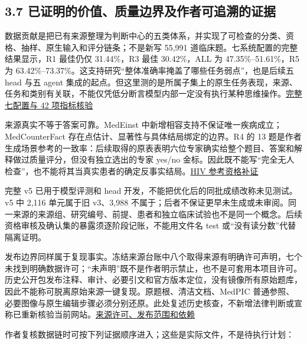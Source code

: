 \documentclass[
  11pt,
  a4paper,
]{article}
\begin{document}
\subsection{3.7
已证明的价值、质量边界及作者可追溯的证据}\label{ux5df2ux8bc1ux660eux7684ux4ef7ux503cux8d28ux91cfux8fb9ux754cux53caux4f5cux8005ux53efux8ffdux6eafux7684ux8bc1ux636e}

数据贡献是把已有来源整理为判断中心的五类体系，并实现了可检查的分类、资格、抽样、原生输入和评分链条；不是新写
55,991 道临床题。七系统配置的完整结果显示，R1 最佳仍仅 31.44\%，R3 最佳
30.42\%，ALL 为 47.35\%--51.61\%，R5 为
63.42\%--73.37\%。这支持研究``整体准确率掩盖了哪些任务弱点''，也是后续五
head 与五 agent
集成的起点。但这里测的是所属子集上的原生任务表现，来源、任务和类别有关联，不能仅凭低分断言模型内部一定没有执行某种思维操作。\href{https://github.com/xiotakut/cf_mrg/blob/main/papers/2026-10-02_cf_moa/author_dossier/sources/13d3f2643dd3_seven_methods_audit.json}{完整七配置与
42 项指标核验}

来源真实不等于答案可靠。MedEinst
中新增相容支持不保证唯一疾病成立；MedCounterFact
存在点估计、显著性与具体结局绑定的边界。R4 的 13
题是作者生成场景参考的一致率：后续取得的原表表明六位专家确实给整个题目、答案和解释做过质量评分，但没有独立选出的专家
yes/no
金标。因此既不能写``完全无人检查''，也不能将其当真实患者的确定反事实结局。\href{https://github.com/xiotakut/cf_mrg/blob/main/papers/2026-10-02_cf_moa/author_dossier/records/data/construction.md\#L3589}{HIV
参考资格补证}

完整 v5 已用于模型评测和 head
开发，不能把优化后的同批成绩改称未见测试。v5 中 2,116 单元属于旧
v3、3,988
不属于；后者不保证更早未生成或未审阅。同一来源的来源组、研究编号、前提、患者和独立临床试验也不是同一个概念。后续资格审核及确认集的暴露须逐阶段记账，不能用文件名
test 或``没有读分数''代替隔离证明。

发布边界同样属于复现事实。冻结来源台账中八个取得来源有明确许可声明，七个未找到明确数据许可；``未声明''既不是作者明示禁止，也不是可套用本项目许可。历史公开包发布注释、审计、必要引文和官方版本定位，没有镜像所有原始题库，因此不能称可脱离原始来源一键复现。原题根、清洁文档、MedPIC
普通参照、必要图像与原生编辑步骤必须分别还原。此处复述历史核查，不新增法律判断或宣称已重新核验当前网站。\href{https://github.com/xiotakut/cf_mrg/blob/main/papers/2026-10-02_cf_moa/author_dossier/records/data/sources.md\#L186}{来源许可、发布范围和依赖}

作者复核数据链时可按下列证据顺序进入；这些是实际文件，不是待执行计划：
\end{document}
